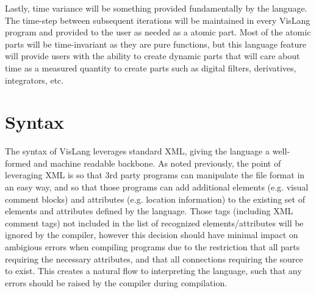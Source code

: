 \documentclass[dvips,12pt]{article}
\begin{document}
Lastly, time variance will be something provided fundamentally by the language.
The time-step between subsequent iterations will be maintained in every VisLang program
and provided to the user as needed as a atomic part. Most of the atomic parts will be
time-invariant as they are pure functions, but this language feature will provide users
with the ability to create dynamic parts that will care about time as a measured quantity
to create parts such as digital filters, derivatives, integrators, etc.

\section{Syntax}

The syntax of VisLang leverages standard XML, giving the language a well-formed and machine
readable backbone. As noted previously, the point of leveraging XML is so that 3rd party
programs can manipulate the file format in an easy way, and so that those programs can add
additional elements (e.g. visual comment blocks) and attributes (e.g. location information)
to the existing set of elements and attributes defined by the language. Those tags (including
XML comment tags) not included in the list of recognized elements/attributes will be 
ignored by the compiler, however this decision should have minimal impact on ambigious
errors when compiling programs due to the restriction that all parts requiring the necessary
attributes, and that all connections requiring the source to exist. This creates a natural
flow to interpreting the language, such that any errors should be raised by the compiler
during compilation. 
\end{document}

